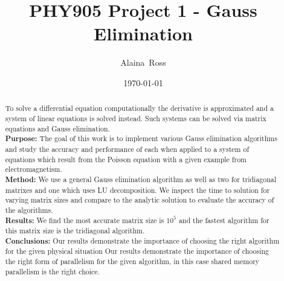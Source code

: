 \documentclass[prc,amsmath,twocolumn,superscriptaddress]{revtex4}
\begin{document}
  \newcommand {\nc} {\newcommand}
  \nc {\Sec} [1] {Sec.~\ref{#1}}
  \nc {\IR} [1] {\textcolor{red}{#1}} 

\title{PHY905 Project 1 - Gauss Elimination}


\author{Alaina~Ross}

\date{\today}


\begin{abstract}
  To solve a differential equation computationally the derivative is approximated and a system of linear equations is solved instead. Such systems can be solved via matrix equations and Gauss elimination. \\
 {\bf Purpose:} The goal of this work is to implement various Gauss elimination algorithms and study the accuracy and performance of each when applied to a system of equations which result from the Poisson equation with a given example from electromagnetism. \\
 {\bf Method:} We use a general Gauss elimination algorithm as well as two for tridiagonal matrixes and one which uses LU decomposition. We inspect the time to solution for varying matrix sizes and compare to the analytic solution to evaluate the accuracy of the algorithms. \\ 
 {\bf Results:} We find the most accurate matrix size is $10^5$ and the fastest algorithm for this matrix size is the tridiagonal algorithm. \\
 {\bf Conclusions:} Our results demonstrate the importance of choosing the right algorithm for the given physical situation
 Our results demonstrate the importance of choosing the right form of parallelism for the given algorithm, in this case shared memory parallelism is the right choice.
\end{abstract}


\maketitle

\end{document}
